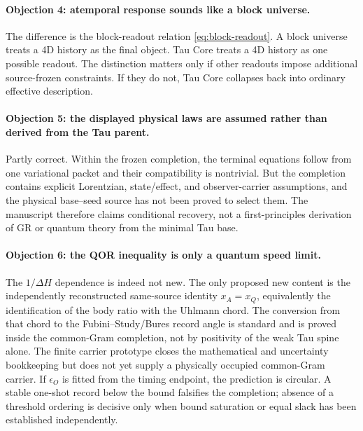 \documentclass[11pt]{article}
\begin{document}
\paragraph{Objection 4: atemporal response sounds like a block universe.}
The difference is the block-readout relation \eqref{eq:block-readout}.  A block
universe treats a 4D history as the final object.  Tau Core treats a 4D history as one possible
readout.  The distinction matters only if other readouts impose additional
source-frozen constraints.  If they do not, Tau Core collapses back into
ordinary effective description.

\paragraph{Objection 5: the displayed physical laws are assumed rather than
derived from the Tau parent.}
Partly correct.  Within the frozen completion, the terminal equations follow
from one variational packet and their compatibility is nontrivial.  But the
completion contains explicit Lorentzian, state/effect, and observer-carrier
assumptions, and the physical base--seed source has not been proved to select
them.  The manuscript therefore claims conditional recovery, not a
first-principles derivation of GR or quantum theory from the minimal Tau base.

\paragraph{Objection 6: the QOR inequality is only a quantum speed limit.}
The \(1/\Delta H\) dependence is indeed not new.  The only proposed new
content is the independently reconstructed same-source identity
\(x_A=x_Q\), equivalently the identification of the body ratio with the
Uhlmann chord.  The conversion from that chord to the Fubini--Study/Bures
record angle is standard and is proved inside the common-Gram completion, not
by positivity of the weak Tau spine alone.  The finite carrier prototype
closes the mathematical and uncertainty bookkeeping but does not yet supply a
physically occupied common-Gram carrier.  If \(\epsilon_O\) is fitted from the timing
endpoint, the prediction is circular.  A stable one-shot record below
the bound falsifies the completion; absence of a threshold ordering is
decisive only when bound saturation or equal slack has been established
independently.
\end{document}
